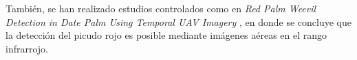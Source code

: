 

También, se han realizado estudios controlados como en \textit{Red Palm Weevil Detection in Date Palm Using Temporal UAV Imagery} \citep{delalieux_red_2023}, en donde se concluye que la detección del picudo rojo es posible mediante imágenes aéreas en el rango infrarrojo.

